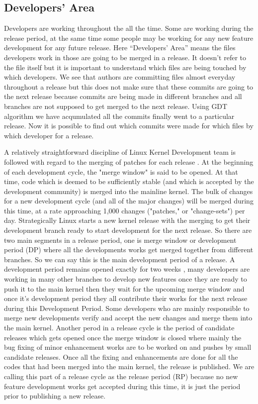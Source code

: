 \documentclass{acm_proc_article-sp}
\begin{document}
\subsection{Developers' Area}
Developers are working throughout the all the time. Some are working during the release period, at the same time some people may be working for any new feature development for any future release. Here ``Developers' Area'' means the files developers work in those are going to be merged in a release. It doesn't refer to the file itself but it is important to understand which files are being touched by which developers. We see that authors are committing files almost everyday throughout a release but this does not make sure that these commits are going to the next release because commits are being made in different branches and all branches are not supposed to get merged to the next release. Using GDT algorithm we have acqumulated all the commits finally went to a particular release. Now it is possible to find out which commits were made for which files by which developer for a release.

A relatively straightforward discipline of Linux Kernel Development team is followed with regard to the merging of patches for each release \cite{linux_kernel}. At the beginning of each development cycle, the "merge window" is said to be opened. At that time, code which is deemed to be sufficiently stable (and which is accepted by the development community) is merged into the mainline kernel. The bulk of changes for a new development cycle (and all of the major changes) will be merged during this time, at a rate approaching 1,000 changes ("patches," or "change-sets") per day. Strategically Linux starts a new kernel release with the merging to get their development branch ready to start development for the next release. So there are two main segments in a release period, one is merge window or development period (DP) where all the developments works get merged together from different branches. So we can say this is the main development period of a release. A development period remains opened exactly for two weeks \cite{linux_kernel}, many developers are working in many other branches to develop new features once they are ready to push it to the main kernel then they wait for the upcoming merge window and once it's development period they all contribute their works for the next release during this Development Period. Some developers who are mainly responsible to merge new developments verify and accept the new changes and merge them into the main kernel. Another perod in a release cycle is the period of candidate releases which gets opened once the merge window is closed where mainly the bug fixing of minor enhancement works are to be worked on and pushes by small candidate releases. Once all the fixing and enhancements are done for all the codes that had been merged into the main kernel, the release is published. We are calling this part of a release cycle as the release period (RP) because no new feature development works get accepted during this time, it is just the period prior to publishing a new release.
\end{document}
